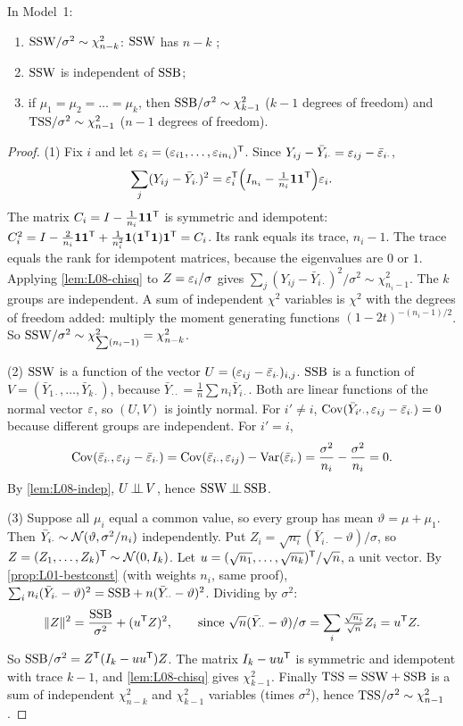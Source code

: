 \begin{theorem}\label{thm:L08-dist}
In Model~1:
\begin{enumerate}
  \item $\mathrm{SSW}/\sigma^2\sim\chi^2_{n-k}$: $\mathrm{SSW}$ has $n-k$ ;
  \item $\mathrm{SSW}$ is independent of $\mathrm{SSB}$;
  \item if $\mu_1=\mu_2=\dots=\mu_k$, then $\mathrm{SSB}/\sigma^2\sim\chi^2_{k-1}$ ($k-1$ degrees of freedom) and $\mathrm{TSS}/\sigma^2\sim\chi^2_{n-1}$ ($n-1$ degrees of freedom).
\end{enumerate}
\end{theorem}
\begin{proof}
(1) Fix $i$ and let $\varepsilon_i=(\varepsilon_{i1},\dots,\varepsilon_{in_i})^{\mathsf T}$. Since $Y_{ij}-\bar Y_{i\cdot}=\varepsilon_{ij}-\bar{\varepsilon}_{i\cdot}$,
\[
\sum_{j}(Y_{ij}-\bar Y_{i\cdot})^2=\varepsilon_i^{\mathsf T}\Bigl(I_{n_i}-\tfrac1{n_i}\mathbf 1\mathbf 1^{\mathsf T}\Bigr)\varepsilon_i .
\]
The matrix $C_i=I-\frac1{n_i}\mathbf 1\mathbf 1^{\mathsf T}$ is symmetric and idempotent: $C_i^2=I-\frac2{n_i}\mathbf 1\mathbf 1^{\mathsf T}+\frac1{n_i^2}\mathbf 1(\mathbf 1^{\mathsf T}\mathbf 1)\mathbf 1^{\mathsf T}=C_i$.
Its rank equals its trace, $n_i-1$. The trace equals the rank for idempotent matrices, because
the eigenvalues are $0$ or $1$. Applying \cref{lem:L08-chisq} to $Z=\varepsilon_i/\sigma$ gives
$\sum_j(Y_{ij}-\bar Y_{i\cdot})^2/\sigma^2\sim\chi^2_{n_i-1}$. The $k$ groups are independent. A sum
of independent $\chi^2$ variables is $\chi^2$ with the degrees of freedom added: multiply the
moment generating functions $(1-2t)^{-(n_i-1)/2}$. So $\mathrm{SSW}/\sigma^2\sim\chi^2_{\sum(n_i-1)}=\chi^2_{n-k}$.

(2) $\mathrm{SSW}$ is a function of the vector $U=(\varepsilon_{ij}-\bar{\varepsilon}_{i\cdot})_{i,j}$. $\mathrm{SSB}$ is a function of
$V=(\bar Y_{1\cdot},\dots,\bar Y_{k\cdot})$, because $\bar Y_{\cdot\cdot}=\frac1n\sum n_i\bar Y_{i\cdot}$. Both are linear
functions of the normal vector $\varepsilon$, so $(U,V)$ is jointly normal. For $i'\ne i$,
$\operatorname{Cov}(\bar Y_{i'\cdot},\varepsilon_{ij}-\bar{\varepsilon}_{i\cdot})=0$ because different groups are independent. For $i'=i$,
\[
\operatorname{Cov}(\bar{\varepsilon}_{i\cdot},\varepsilon_{ij}-\bar{\varepsilon}_{i\cdot})=\operatorname{Cov}(\bar{\varepsilon}_{i\cdot},\varepsilon_{ij})-\operatorname{Var}(\bar{\varepsilon}_{i\cdot})=\frac{\sigma^2}{n_i}-\frac{\sigma^2}{n_i}=0 .
\]
By \cref{lem:L08-indep}, $U\operatorname{\perp\!\!\!\perp} V$, hence $\mathrm{SSW}\operatorname{\perp\!\!\!\perp}\mathrm{SSB}$.

(3) Suppose all $\mu_i$ equal a common value, so every group has mean $\vartheta=\mu+\mu_1$. Then
$\bar Y_{i\cdot}\sim\mathcal N(\vartheta,\sigma^2/n_i)$ independently. Put $Z_i=\sqrt{n_i}(\bar Y_{i\cdot}-\vartheta)/\sigma$, so
$Z=(Z_1,\dots,Z_k)^{\mathsf T}\sim\mathcal N(0,I_k)$. Let $u=(\sqrt{n_1},\dots,\sqrt{n_k})^{\mathsf T}/\sqrt n$, a unit vector. By
\cref{prop:L01-bestconst} (with weights $n_i$, same proof),
$\sum_i n_i(\bar Y_{i\cdot}-\vartheta)^2=\mathrm{SSB}+n(\bar Y_{\cdot\cdot}-\vartheta)^2$. Dividing by $\sigma^2$:
\[
\|Z\|^2=\frac{\mathrm{SSB}}{\sigma^2}+(u^{\mathsf T} Z)^2,\qquad\text{since } \sqrt n(\bar Y_{\cdot\cdot}-\vartheta)/\sigma=\sum_i\tfrac{\sqrt{n_i}}{\sqrt n}Z_i=u^{\mathsf T} Z .
\]
So $\mathrm{SSB}/\sigma^2=Z^{\mathsf T}(I_k-uu^{\mathsf T})Z$. The matrix $I_k-uu^{\mathsf T}$ is symmetric and idempotent with trace
$k-1$, and \cref{lem:L08-chisq} gives $\chi^2_{k-1}$. Finally $\mathrm{TSS}=\mathrm{SSW}+\mathrm{SSB}$ is a sum of
independent $\chi^2_{n-k}$ and $\chi^2_{k-1}$ variables (times $\sigma^2$), hence $\mathrm{TSS}/\sigma^2\sim\chi^2_{n-1}$.
\end{proof}

